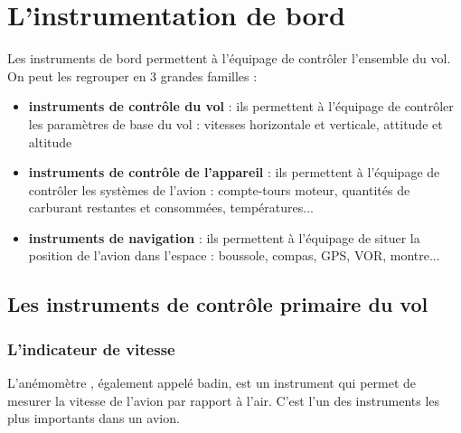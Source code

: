 \section{L'instrumentation de bord}
	Les instruments de bord  permettent à l'équipage de contrôler l'ensemble du vol. On peut les regrouper en 3 grandes familles :
	\begin{itemize}
		\item \textbf{instruments de contrôle du vol} : ils permettent à l'équipage de contrôler les paramètres de base du vol : vitesses horizontale et verticale, attitude et altitude
		\item \textbf{instruments de contrôle de l'appareil} : ils permettent à l'équipage de contrôler les systèmes de l'avion : compte-tours moteur, quantités de carburant restantes et consommées, températures...
		\item \textbf{instruments de navigation} : ils permettent à l'équipage de situer la position de l'avion dans l'espace : boussole, compas, GPS, VOR, montre...
	\end{itemize}
	
	\subsection{Les instruments de contrôle primaire du vol}
	\subsubsection{L'indicateur de vitesse}
	L'\gls{anémomètre} , également appelé \gls{badin}, est un instrument qui permet de mesurer la vitesse de l'avion par rapport à l'air. C'est l'un des instruments les plus importants dans un avion.

	\begin{figure}[H]	
	\centering
	\end{figure}
	
	
